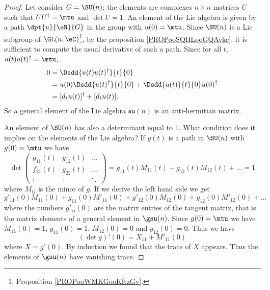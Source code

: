 \begin{proof}
    Let consider $G=\SU(n)$; the elements are complexes $n\times n$ matrices $U$ such that $UU^{\dag}=\mtu$ and $\det U=1$. An element of the Lie algebra is given by a path $\dpt{u}{\eR}{G}$ in the group with $u(0)=\mtu$. Since \( \SU(n)\) is a Lie subgroup of \( \GL(n,\eC)\)\footnote{Proposition \ref{PROPooWMKGooKftzGv}.}, by the proposition \ref{PROPooSQHLooGQAykc}, it is sufficient to compute the usual derivative of such a path.
    Since for all $t$, $u(t)u(t)^{\dag}=\mtu$,
    \begin{subequations}
        \begin{align}
      0&=\Dsdd{u(t)u(t)^{\dag}}{t}{0}\\
       &=u(0)\Dsdd{u(t)^{\dag}}{t}{0}+\Dsdd{u(t)}{t}{0}u(0)^{\dag}\\
       &=[d_tu(t)]^{\dag}+[d_tu(t)].
        \end{align}
    \end{subequations}
    So a general element of the Lie algebra $\mathfrak{su}(n)$ is an anti-hermitian matrix.

    An element of \( \SU(n)\) has also a determinant equal to \( 1\). What condition does it implies on the elements of the Lie algebra? If \( g(t)\) is a path in \( \SU(n)\) with \( g(0)=\mtu\) we have
    \begin{equation}
        \det\begin{pmatrix}
            g_{11}(t)    &   g_{12}(t)    &   \ldots    \\
            f_{21}(t)    &   g_{22}(t)    &   \ldots    \\
            \vdots    &   \vdots    &   \ddots
        \end{pmatrix}=g_{11}(t)M_{11}(t)+g_{12}(t)M_{12}(t)+\ldots=1
    \end{equation}
    where \( M_{ij}\) is the minor of \( g\). If we derive the left hand side we get
    \begin{equation}
        g'_{11}(0)M_{11}(0)+g_{11}(0)M'_{11}(0)+g'_{12}(0)M_{12}(0)+g_{12}(0)M'_{12}(0)+\ldots
    \end{equation}
    where the numbers \( g'_{ij}(0)\) are the matrix entries of the tangent matrix, that is the matrix elements of a general element in \( \gsu(n)\). Since \( g(0)=\mtu\) we have \( M_{11}(0)=1\), \( g_{11}(0)=1\), \( M_{12}(0)=0\) and \( g_{12}(0)=0\). Thus we have
    \begin{equation}
        (\det g)'(0)=X_{11}+M'_{11}(0)
    \end{equation}
    where \( X=g'(0)\). By induction we found that the trace of \( X\) appears. Thus the elements of \( \gsu(n)\) have vanishing trace.
\end{proof}

